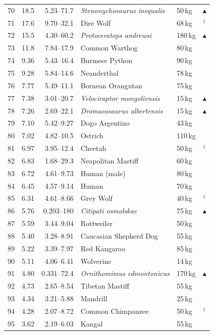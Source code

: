 \documentclass[11pt]{article}
\begin{document}
\begin{longtable}{rrrllc}
70 & 18.5 & 5.23--71.7 & \textit{Stenonychosaurus inequalis} & 50\,kg & $\blacktriangle$ \\
71 & 17.6 & 9.70--32.1 & Dire Wolf & 68\,kg & $^{\dagger}$ \\
72 & 15.5 & 4.30--60.2 & \textit{Protoceratops andrewsi} & 180\,kg & $\blacktriangle$ \\
73 & 11.8 & 7.84--17.9 & Common Warthog & 80\,kg &  \\
74 & 9.36 & 5.43--16.4 & Burmese Python & 90\,kg &  \\
75 & 9.28 & 5.84--14.6 & Neanderthal & 78\,kg &  \\
76 & 7.77 & 5.49--11.1 & Bornean Orangutan & 75\,kg &  \\
77 & 7.38 & 3.01--20.7 & \textit{Velociraptor mongoliensis} & 15\,kg & $\blacktriangle$ \\
78 & 7.26 & 2.69--22.1 & \textit{Dromaeosaurus albertensis} & 15\,kg & $\blacktriangle$ \\
79 & 7.10 & 5.42--9.27 & Dogo Argentino & 43\,kg &  \\
80 & 7.02 & 4.82--10.5 & Ostrich & 110\,kg &  \\
81 & 6.97 & 3.95--12.4 & Cheetah & 50\,kg & $^{\dagger}$ \\
82 & 6.83 & 1.68--29.3 & Neapolitan Mastiff & 60\,kg &  \\
83 & 6.72 & 4.61--9.73 & Human (male) & 80\,kg &  \\
84 & 6.45 & 4.57--9.14 & Human & 70\,kg &  \\
85 & 6.31 & 4.61--8.66 & Grey Wolf & 40\,kg & $^{\dagger}$ \\
86 & 5.76 & 0.203--180 & \textit{Citipati osmolskae} & 75\,kg & $\blacktriangle$ \\
87 & 5.59 & 3.44--9.04 & Rottweiler & 50\,kg &  \\
88 & 5.40 & 3.28--8.91 & Caucasian Shepherd Dog & 55\,kg &  \\
89 & 5.22 & 3.39--7.97 & Red Kangaroo & 85\,kg &  \\
90 & 5.11 & 4.06--6.41 & Wolverine & 14\,kg &  \\
91 & 4.80 & 0.331--72.4 & \textit{Ornithomimus edmontonicus} & 170\,kg & $\blacktriangle$ \\
92 & 4.73 & 2.65--8.54 & Tibetan Mastiff & 55\,kg &  \\
93 & 4.34 & 3.21--5.88 & Mandrill & 25\,kg &  \\
94 & 4.28 & 2.07--8.72 & Common Chimpanzee & 50\,kg & $^{\dagger}$ \\
95 & 3.62 & 2.19--6.03 & Kangal & 55\,kg &  \\

\end{longtable}
\end{document}
